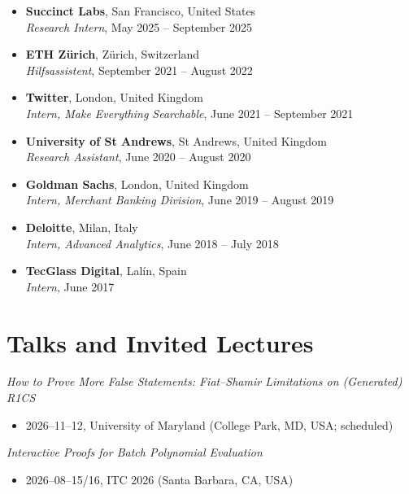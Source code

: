 \documentclass[11pt,a4paper]{article}
\begin{document}
\begin{itemize}[leftmargin=1.5em]

  \item \textbf{Succinct Labs}, San Francisco, United States\\
  \textit{Research Intern}, \hfill May 2025 -- September 2025

  \item \textbf{ETH Z\"urich}, Z\"urich, Switzerland\\
  \textit{Hilfsassistent}, \hfill September 2021 -- August 2022

  \item \textbf{Twitter}, London, United Kingdom\\
  \textit{Intern, Make Everything Searchable}, \hfill June 2021 -- September 2021

  \item \textbf{University of St Andrews}, St Andrews, United Kingdom\\
  \textit{Research Assistant}, \hfill June 2020 -- August 2020

  \item \textbf{Goldman Sachs}, London, United Kingdom\\
  \textit{Intern, Merchant Banking Division}, \hfill June 2019 -- August 2019

  \item \textbf{Deloitte}, Milan, Italy\\
  \textit{Intern, Advanced Analytics}, \hfill June 2018 -- July 2018

  \item \textbf{TecGlass Digital}, Lalín, Spain\\
  \textit{Intern}, \hfill June 2017
\end{itemize}

\section*{Talks and Invited Lectures}

\emph{How to Prove More False Statements: Fiat--Shamir Limitations on (Generated) R1CS}
\begin{itemize}[leftmargin=2em]
  \item 2026--11--12, University of Maryland (College Park, MD, USA; scheduled)
\end{itemize}

\emph{Interactive Proofs for Batch Polynomial Evaluation}
\begin{itemize}[leftmargin=2em]
  \item 2026--08--15/16, ITC 2026 (Santa Barbara, CA, USA)
\end{itemize}
\end{document}

